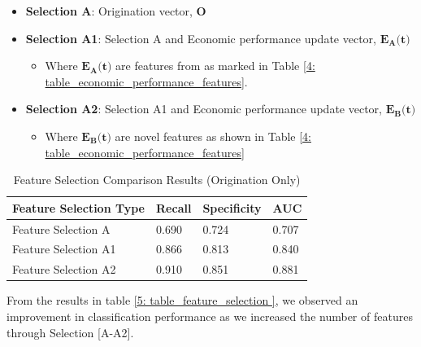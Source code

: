             \begin{itemize}
              \item \textbf{Selection A}: Origination vector, $\textbf{O}$
              \item \textbf{Selection A1}: Selection A and Economic performance update vector, $\textbf{$\textbf{$\mathbf{E_{A}}$}$(t)}$
              \begin{itemize}
                    \item Where $\textbf{$\textbf{$\mathbf{E_{A}}$}$(t)}$ are features from \cite{mortgage_risk} as marked in Table \ref{4: table_economic_performance_features}.
                \end{itemize}
              \item \textbf{Selection A2}: Selection A1 and Economic performance update vector, $\textbf{$\textbf{$\mathbf{E_{B}}$}$(t)}$
                \begin{itemize}
                    \item Where $\textbf{$\textbf{$\mathbf{E_{B}}$}$(t)}$ are novel features as shown in Table \ref{4: table_economic_performance_features} 
                \end{itemize}
    
            \end{itemize}
            
            \begin{table}[H]
                \centering
                \caption{Feature Selection Comparison Results (Origination Only)} \vspace{0.5cm}
                \label{5: table_feature_selection_origin }
                    \begin{tabular}{|p{6.5cm}|p{2.5cm}|p{2.5cm}|p{2.5cm}|}
                        \hline \textbf{Feature Selection Type} & \textbf{Recall} & \textbf{Specificity} & \textbf{AUC} \\ \hline \hline
                        Feature Selection A & 0.690 & 0.724 & 0.707 \\ \hline
                        Feature Selection A1 & 0.866 & 0.813 & 0.840 \\ \hline
                        Feature Selection A2 & 0.910 & 0.851 & 0.881 \\ \hline
                    \end{tabular}
            \end{table}
            
            From the results in table \ref{5: table_feature_selection }, we observed an improvement in classification performance as we increased the number of features through Selection [A-A2]. 
            
